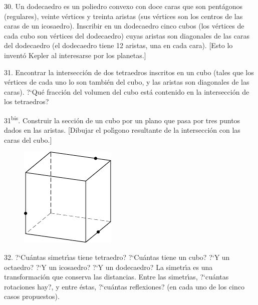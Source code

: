 \begin{problem}{30.}
	Un dodecaedro es un poliedro convexo con doce caras que son pent\'agonos (regulares), veinte v\'ertices y treinta aristas
	(sus v\'ertices son los centros de las caras de un icosaedro).
	Inscribir en un dodecaedro cinco cubos (los v\'ertices de cada cubo son v\'ertices del dodecaedro)
	cuyas aristas son diagonales de las caras del dodecaedro (el dodecaedro tiene 12 aristas, una en cada cara).
	[Esto lo invent\'o Kepler al interesarse por los planetas.]
\end{problem}

\begin{problem}{31.}
	Encontrar la intersecci\'on de dos tetraedros inscritos en un cubo (tales que los v\'ertices de cada uno lo son tambi\'en del cubo, y las aristas son diagonales de las caras).
	?`Qu\'e fracci\'on del volumen del cubo est\'a contenido en la intersecci\'on de los tetraedros?
\end{problem}

\begin{problem}{31\textsuperscript{bis}.}
	Construir la secci\'on de un cubo por un plano que pasa por tres puntos dados en las aristas.
	[Dibujar el pol\'{\i}gono resultante de la intersecci\'on con las caras del cubo.]
	\begin{figure}
		\includegraphics{resources/taskbook-15}
	\end{figure}
\end{problem}

\begin{problem}{32.}
	?`Cu\'antas simetr\'{\i}as tiene tetraedro? ?`Cu\'antas tiene un cubo? ?`Y un octaedro? ?`Y un icosaedro? ?`Y un dodecaedro?
	La simetr\'{\i}a es una transformaci\'on que conserva las distancias.
	Entre las simetr\'{\i}as, ?`cu\'antas rotaciones hay?, y entre \'estas, ?`cu\'antas reflexiones? (en cada uno de los cinco
	casos propuestos).
\end{problem}

